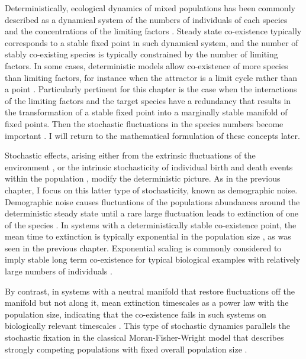 Deterministically, ecological dynamics of mixed populations has been commonly described as a dynamical system of the numbers of individuals of each species and the concentrations of the limiting factors \cite{Armstrong1976,McGehee1977a,Armstrong1980}. 
Steady state co-existence typically corresponds to a stable fixed point in such dynamical system, and the number of stably co-existing species is typically constrained by the number of limiting factors. 
In some cases, deterministic models allow co-existence of more species than limiting factors, for instance when the attractor is a limit cycle rather than a point \cite{Smale1976,Armstrong1980}. 
Particularly pertinent for this chapter is the case when the interactions of the limiting factors and the target species have a redundancy that results in the transformation of a stable fixed point into a marginally stable manifold of fixed points. 
Then the stochastic fluctuations in the species numbers become important \cite{Volterra1926,Armstrong1980,Bomze1983,Chesson1990,Antal2006,Posfai2017}. 
I will return to the mathematical formulation of these concepts later. %

Stochastic effects, arising either from the extrinsic fluctuations of the environment \cite{Kamenev2008a,Chotibut2017b}, or the intrinsic stochasticity of individual birth and death events within the population \cite{Assaf2006,Gottesman2012,Dobrinevski2012,Gabel2013,Fisher2014,Constable2015,Lin2012,Chotibut2015,Young2018}, modify the deterministic picture. 
As in the previous chapter, I focus on this latter type of stochasticity, known as demographic noise. %
Demographic noise causes fluctuations of the populations abundances around the deterministic steady state until a rare large fluctuation leads to extinction of one of the species \cite{Kimura1968,Lin2012,Chotibut2015}. 
In systems with a deterministically stable co-existence point, the mean time to extinction is typically exponential in the population size \cite{Norden1982,Kamenev2008,Assaf2010,Ovaskainen2010}, as was seen in the previous chapter. 
Exponential scaling is commonly considered to imply stable long term co-existence for typical biological examples with relatively large numbers of individuals \cite{Ovaskainen2010,Lin2015}.

By contrast, in systems with a neutral manifold that restore fluctuations off the manifold but not along it, mean extinction timescales as a power law with the population size, indicating that the co-existence fails in such systems on biologically relevant timescales \cite{Kimura1955,Moran1962,Lin2012,Chotibut2017a}. 
This type of stochastic dynamics parallels the stochastic fixation in the classical Moran-Fisher-Wright model that describes strongly competing populations with fixed overall population size \cite{Wright1931,Fisher1930,Moran1962,Kimura1968,Rice2004,Rogers2014,Stirk2010,Capitan2017}.

